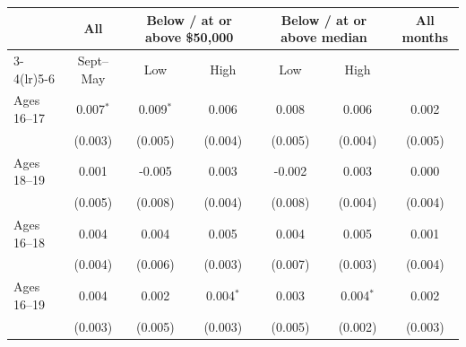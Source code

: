 \begin{tabular}{lcccccc}
\toprule
 & All & \multicolumn{2}{c}{Below / at or above \$50,000} & \multicolumn{2}{c}{Below / at or above median} & All months \\
\cmidrule(lr){3-4}\cmidrule(lr){5-6}
 & Sept--May & Low & High & Low & High & \\
\midrule
Ages 16--17 & 0.007$^{*}$ & 0.009$^{*}$ & 0.006 & 0.008 & 0.006 & 0.002 \\
 & (0.003) & (0.005) & (0.004) & (0.005) & (0.004) & (0.005) \\
Ages 18--19 & 0.001 & -0.005 & 0.003 & -0.002 & 0.003 & 0.000 \\
 & (0.005) & (0.008) & (0.004) & (0.008) & (0.004) & (0.004) \\
Ages 16--18 & 0.004 & 0.004 & 0.005 & 0.004 & 0.005 & 0.001 \\
 & (0.004) & (0.006) & (0.003) & (0.007) & (0.003) & (0.004) \\
Ages 16--19 & 0.004 & 0.002 & 0.004$^{*}$ & 0.003 & 0.004$^{*}$ & 0.002 \\
 & (0.003) & (0.005) & (0.003) & (0.005) & (0.002) & (0.003) \\
\bottomrule
\end{tabular}
